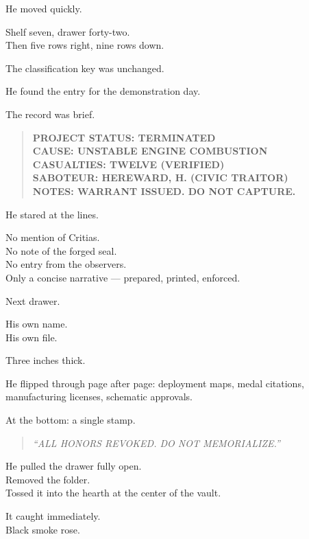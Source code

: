 \documentclass[9pt]{article}
\begin{document}
He moved quickly.

Shelf seven, drawer forty-two.\\
Then five rows right, nine rows down.

The classification key was unchanged.

\vspace{1em}

He found the entry for the demonstration day.

The record was brief.

\begin{quote}
\textbf{PROJECT STATUS: TERMINATED}\\
\textbf{CAUSE: UNSTABLE ENGINE COMBUSTION}\\
\textbf{CASUALTIES: TWELVE (VERIFIED)}\\
\textbf{SABOTEUR: HEREWARD, H. (CIVIC TRAITOR)}\\
\textbf{NOTES: WARRANT ISSUED. DO NOT CAPTURE.}
\end{quote}

\vspace{1em}

He stared at the lines.

No mention of Critias.\\
No note of the forged seal.\\
No entry from the observers.\\
Only a concise narrative — prepared, printed, enforced.

\vspace{1em}

Next drawer.

His own name.\\
His own file.

Three inches thick.

He flipped through page after page: deployment maps, medal citations, manufacturing licenses, schematic approvals.

At the bottom: a single stamp.

\begin{quote}
\textit{“ALL HONORS REVOKED. DO NOT MEMORIALIZE.”}
\end{quote}

\vspace{1em}

He pulled the drawer fully open.\\
Removed the folder.\\
Tossed it into the hearth at the center of the vault.

It caught immediately.\\
Black smoke rose.
\end{document}
